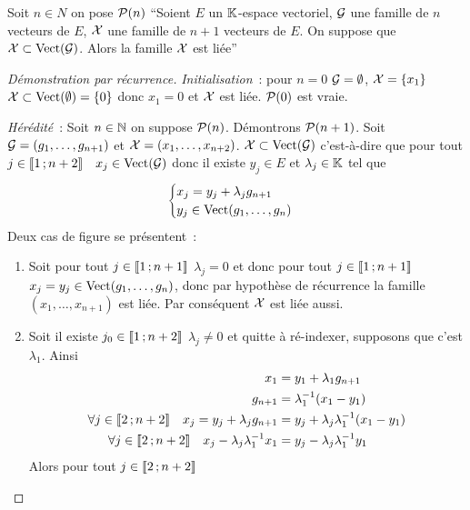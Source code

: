 \begin{lemme}
  Soit \(n \in N\) on pose \(\P(n)\) ``Soient \(E\) un \(\K\)-espace vectoriel, \(\G\) une famille de \(n\) vecteurs de \(E\), \(\X\) une famille de \(n+1\) vecteurs de \(E\). On suppose que \(\X \subset \VectEngendre(\G)\). Alors la famille \(\X\) est liée''
\end{lemme}
\begin{proof}[Démonstration par récurrence]
  \emph{Initialisation}~: pour \(n=0\) \(\G=\emptyset\), \(\X=\{x_1\}\) \(\X \subset \VectEngendre(\emptyset)=\{0\}\) donc \(x_1=0\) et \(\X\) est liée. \(\P(0)\) est vraie.

  \emph{Hérédité}~: Soit \(n \in \N\) on suppose \(\P(n)\). Démontrons \(\P(n+1)\). Soit \(\G=(g_1, \ldots, g_{n+1})\) et \(\X=(x_1, \ldots, x_{n+2})\). \(\X \subset \VectEngendre(\G)\) c'est-à-dire que pour tout \(j \in \intervalleentier{1}{n+2} \quad x_j \in \VectEngendre(\G)\) donc il existe \(y_j \in E\) et \(\lambda_j \in \K\) tel que
  \begin{equation}
    \begin{cases} x_j = y_j + \lambda_j g_{n+1} \\ y_j \in \VectEngendre(g_1, \ldots, g_n) \end{cases}
  \end{equation}
  Deux cas de figure se présentent~:
  \begin{enumerate}
    \item Soit pour tout \(j \in \intervalleentier{1}{n+1}\) \(\lambda_j=0\) et donc pour tout \(j \in \intervalleentier{1}{n+1}\) \(x_j=y_j \in \VectEngendre(g_1, \ldots, g_n)\), donc par hypothèse de récurrence la famille \((x_1, \ldots, x_{n+1})\) est liée. Par conséquent \(\X\) est liée aussi.
    \item Soit il existe \(j_0 \in \intervalleentier{1}{n+2}\) \(\lambda_j \neq 0\) et quitte à ré-indexer, supposons que c'est \(\lambda_1\). Ainsi
      \begin{align}
        x_1 &= y_1 + \lambda_1 g_{n+1} \\
        g_{n+1} &= \lambda_1^{-1}(x_1-y_1) \\
        \forall j \in \intervalleentier{2}{n+2} \quad x_j = y_j + \lambda_j g_{n+1} &= y_j + \lambda_j \lambda_1^{-1}(x_1-y_1)\\
        \forall j \in \intervalleentier{2}{n+2} \quad x_j - \lambda_j\lambda_1^{-1}x_1 &= y_j - \lambda_j \lambda_1^{-1} y_1
      \end{align}
      Alors pour tout \(j \in \intervalleentier{2}{n+2}\)

\end{enumerate}
\end{proof}

